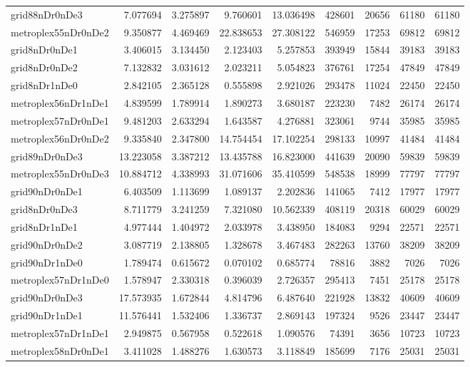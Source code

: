 \documentclass[../../../thesis.tex]{subfiles}
\begin{document}
\begin{longtable}{|l|r|r|r|r|r|r|r|r|}
grid88nDr0nDe3 & 7.077694 & 3.275897 & 9.760601 & 13.036498 & 428601 & 20656 & 61180 & 61180 \\
metroplex55nDr0nDe2 & 9.350877 & 4.469469 & 22.838653 & 27.308122 & 546959 & 17253 & 69812 & 69812 \\
grid8nDr0nDe1 & 3.406015 & 3.134450 & 2.123403 & 5.257853 & 393949 & 15844 & 39183 & 39183 \\
grid8nDr0nDe2 & 7.132832 & 3.031612 & 2.023211 & 5.054823 & 376761 & 17254 & 47849 & 47849 \\
grid8nDr1nDe0 & 2.842105 & 2.365128 & 0.555898 & 2.921026 & 293478 & 11024 & 22450 & 22450 \\
metroplex56nDr1nDe1 & 4.839599 & 1.789914 & 1.890273 & 3.680187 & 223230 & 7482 & 26174 & 26174 \\
metroplex57nDr0nDe1 & 9.481203 & 2.633294 & 1.643587 & 4.276881 & 323061 & 9744 & 35985 & 35985 \\
metroplex56nDr0nDe2 & 9.335840 & 2.347800 & 14.754454 & 17.102254 & 298133 & 10997 & 41484 & 41484 \\
grid89nDr0nDe3 & 13.223058 & 3.387212 & 13.435788 & 16.823000 & 441639 & 20090 & 59839 & 59839 \\
metroplex55nDr0nDe3 & 10.884712 & 4.338993 & 31.071606 & 35.410599 & 548538 & 18999 & 77797 & 77797 \\
grid90nDr0nDe1 & 6.403509 & 1.113699 & 1.089137 & 2.202836 & 141065 & 7412 & 17977 & 17977 \\
grid8nDr0nDe3 & 8.711779 & 3.241259 & 7.321080 & 10.562339 & 408119 & 20318 & 60029 & 60029 \\
grid8nDr1nDe1 & 4.977444 & 1.404972 & 2.033978 & 3.438950 & 184083 & 9294 & 22571 & 22571 \\
grid90nDr0nDe2 & 3.087719 & 2.138805 & 1.328678 & 3.467483 & 282263 & 13760 & 38209 & 38209 \\
grid90nDr1nDe0 & 1.789474 & 0.615672 & 0.070102 & 0.685774 & 78816 & 3882 & 7026 & 7026 \\
metroplex57nDr1nDe0 & 1.578947 & 2.330318 & 0.396039 & 2.726357 & 295413 & 7451 & 25178 & 25178 \\
grid90nDr0nDe3 & 17.573935 & 1.672844 & 4.814796 & 6.487640 & 221928 & 13832 & 40609 & 40609 \\
grid90nDr1nDe1 & 11.576441 & 1.532406 & 1.336737 & 2.869143 & 197324 & 9526 & 23447 & 23447 \\
metroplex57nDr1nDe1 & 2.949875 & 0.567958 & 0.522618 & 1.090576 & 74391 & 3656 & 10723 & 10723 \\
metroplex58nDr0nDe1 & 3.411028 & 1.488276 & 1.630573 & 3.118849 & 185699 & 7176 & 25031 & 25031 \\

\end{longtable}
\end{document}
